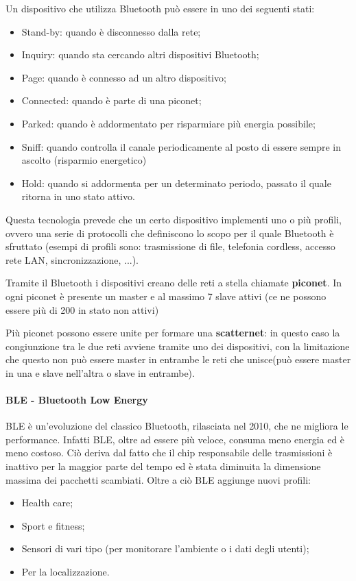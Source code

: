 Un dispositivo che utilizza Bluetooth può essere in uno dei seguenti stati:
\begin{itemize}
  \item Stand-by: quando è disconnesso dalla rete;
  \item Inquiry: quando sta cercando altri dispositivi Bluetooth;
  \item Page: quando è connesso ad un altro dispositivo;
  \item Connected: quando è parte di una piconet;
  \item Parked: quando è addormentato per risparmiare più energia possibile;
  \item Sniff: quando controlla il canale periodicamente al posto di essere 
        sempre in ascolto (risparmio energetico)
  \item Hold: quando si addormenta per un determinato periodo, passato il quale 
        ritorna in uno stato attivo.
\end{itemize}

Questa tecnologia prevede che un certo dispositivo implementi uno o più profili, 
ovvero una serie di protocolli che definiscono lo scopo per il quale Bluetooth è 
sfruttato (esempi di profili sono: trasmissione di file, telefonia cordless, 
accesso rete LAN, sincronizzazione, ...).

Tramite il Bluetooth i dispositivi creano delle reti a stella chiamate 
\textbf{piconet}. In ogni piconet è presente un master e al massimo 7 slave 
attivi (ce ne possono essere più di 200 in stato non attivi)

Più piconet possono essere unite per formare una \textbf{scatternet}: in questo 
caso la congiunzione tra le due reti avviene tramite uno dei dispositivi, con la 
limitazione che questo non può essere master in entrambe le reti che unisce(può 
essere master in una e slave nell'altra o slave in entrambe).

\paragraph{BLE - Bluetooth Low Energy}
BLE è un'evoluzione del classico Bluetooth, rilasciata nel 2010, che ne migliora 
le performance. Infatti BLE, oltre ad essere più veloce, consuma meno energia ed 
è meno costoso. Ciò deriva dal fatto che il chip responsabile delle trasmissioni 
è inattivo per la maggior parte del tempo ed è stata diminuita la dimensione 
massima dei pacchetti scambiati. Oltre a ciò BLE aggiunge nuovi profili:
\begin{itemize}
  \item Health care;
  \item Sport e fitness;
  \item Sensori di vari tipo (per monitorare l'ambiente o i dati degli utenti);
  \item Per la localizzazione.
\end{itemize}


